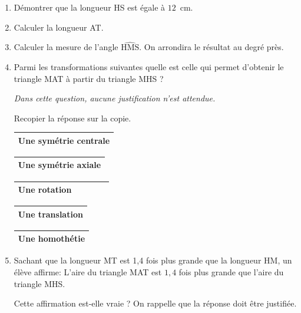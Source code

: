 \documentclass[exercice,a4]{thedocument}%
\begin{document}
\begin{enumerate}
\item Démontrer que la longueur HS est égale à $12$~cm.
\item Calculer la longueur AT.
\item Calculer la mesure de l'angle $\widehat{\text{HMS}}$. On arrondira le résultat au degré près.
\item Parmi les transformations suivantes quelle est celle qui permet d'obtenir le triangle MAT à partir du triangle MHS ?

\emph{Dans cette question, aucune justification n'est attendue.}

Recopier la réponse sur la copie.


\begin{minipage}{2.35cm}
\begin{tabular}{|m{2.35cm}|}\hline
Une symétrie centrale\\ \hline
\end{tabular}
\end{minipage}\quad
\begin{minipage}{2.35cm}
\begin{tabular}{|m{2.35cm}|}\hline
Une symétrie axiale\\ \hline
\end{tabular}
\end{minipage}\quad
\begin{minipage}{2.15cm}
\begin{tabular}{|m{2.15cm}|}\hline
Une rotation~~~~~~~\\ \hline
\end{tabular}
\end{minipage}\quad
\begin{minipage}{2.35cm}
\begin{tabular}{|m{2.35cm}|}\hline
Une translation\\ \hline
\end{tabular}
\end{minipage}\quad
\begin{minipage}{2.35cm}
\begin{tabular}{|m{2.35cm}|}\hline
Une homothétie\\ \hline
\end{tabular}
\end{minipage}


\item Sachant que la longueur MT est 1,4 fois plus grande que la longueur HM, un élève affirme: \og L'aire du triangle MAT est $1,4$ fois plus grande que l'aire du triangle MHS. \fg

Cette affirmation est-elle vraie ? On rappelle que la réponse doit être justifiée.
\end{enumerate}

\bigskip

\showthesource
\end{document}
